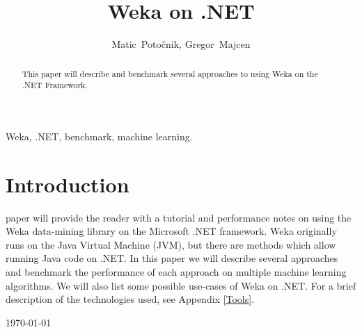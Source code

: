 \documentclass[journal]{IEEEtran/IEEEtran}
\begin{document}
\title{Weka on .NET}

\author{Matic~Potočnik, Gregor~Majcen}%


\maketitle

\begin{abstract}
This paper will describe and benchmark several approaches to using Weka on the .NET Framework.
\end{abstract}

\begin{IEEEkeywords}
Weka, .NET, benchmark, machine learning.
\end{IEEEkeywords}

\IEEEpeerreviewmaketitle

\section{Introduction}
 paper will provide the reader with a tutorial and performance notes on using the Weka data-mining library on the Microsoft .NET framework. Weka originally runs on the Java Virtual Machine (JVM), but there are methods which allow running Java code on .NET. In this paper we will describe several approaches and benchmark the performance of each approach on multiple machine learning algorithms. We will also list some possible use-cases of Weka on .NET. For a brief description of the technologies used, see Appendix \ref{Tools}.

\hfill \today
\end{document}
